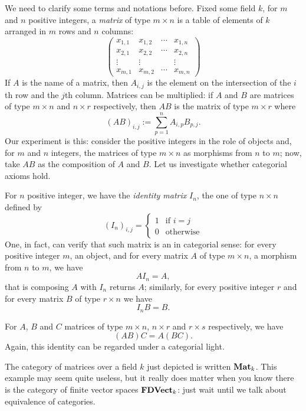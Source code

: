 \begin{example}[Matrices]
  We need to clarify some terms and notations before. Fixed some field
  \(k\), for \(m\) and \(n\) positive integers, a {\em matrix} of type
  \(m \times n\) is a table of elements of \(k\) arranged in \(m\)
  rows and \(n\) columns:
  \[\begin{pmatrix}
    x_{1,1} & x_{1,2} & \cdots{} & x_{1,n} \\
    x_{2,1} & x_{2,2} & \cdots{} & x_{2,n} \\
    \vdots  & \vdots  &          & \vdots  \\
    x_{m,1} & x_{m,2} & \cdots{} & x_{m,n}
  \end{pmatrix}\]
If \(A\) is the name of a matrix, then \(A_{i, j}\) is the element on the intersection of the \(i\)th row and the \(j\)th column. Matrices can be multiplied: if \(A\) and \(B\) are matrices of type \(m \times n\) and \(n \times r\) respectively, then \(AB\) is the matrix of type \(m \times r\) where
\[(AB)_{i, j} := \sum_{p = 1}^n A_{i, p} B_{p ,j} .\] Our experiment
is this: consider the positive integers in the role of objects and,
for \(m\) and \(n\) integers, the matrices of type \(m \times n\) as
morphisms from \(n\) to \(m\); now, take \(AB\) as the composition of
\(A\) and \(B\). Let us investigate whether categorial axioms hold.
\begin{tcbitem}
\item For \(n\) positive integer, we have the {\em identity matrix}
  \(I_n\), the one of type \(n \times n\) defined by
  \[(I_n)_{i, j} = \begin{cases}
    1 & \text{if } i = j \\
    0 & \text{otherwise}
  \end{cases}\]
One, in fact, can verify that such matrix is an  in categorial sense: for every positive integer \(m\), an object, and for every matrix \(A\) of type \(m \times n\), a morphism from \(n\) to \(m\), we have
\[A I_n = A ,\] that is composing \(A\) with \(I_n\) returns \(A\);
similarly, for every positive integer \(r\) and for every matrix \(B\)
of type \(r \times n\) we have
\[I_n B = B .\]
\item For \(A\), \(B\) and \(C\) matrices of type \(m \times n\),
  \(n \times r\) and \(r \times s\) respectively, we have
  \[(AB)C = A(BC) .\] Again, this identity can be regarded under a
  categorial light.
\end{tcbitem}
The category of matrices over a field \(k\) just depicted is written
\(\mathbf{Mat}_k\). This example may seem quite useless, but it really does
matter when you know there is the category of finite vector spaces
\(\mathbf{FDVect}_k\): just wait until we talk about equivalence of
categories. 
\end{example}

